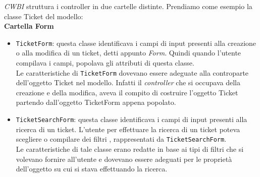 \noindent
\textit{CWBI} struttura i controller in due cartelle distinte. Prendiamo come esempio la classe Ticket del modello:\\

\textbf{Cartella Form}
\begin{itemize}
\item \texttt{TicketForm}: questa classe identificava i campi di input presenti alla creazione o alla modifica di un ticket, detti appunto \textit{Form}. Quindi quando l'utente compilava i campi, popolava gli attributi di questa classe. \\ Le caratteristiche di \texttt{TicketForm} dovevano essere adeguate alla controparte dell'oggetto Ticket nel modello. Infatti il \textit{controller} che si occupava della creazione e della modifica, aveva il compito di costruire l'oggetto Ticket partendo dall'oggetto TicketForm appena popolato. 

\item \texttt{TicketSearchForm}: questa classe identificava i campi di input presenti alla ricerca di un ticket. L'utente per effettuare la ricerca di un ticket poteva scegliere o compilare dei filtri , rappresentati da \texttt{TicketSearchForm}. \\
Le caratteristiche di tale classe erano redatte in base ai tipi di filtri che si volevano fornire all'utente e dovevano essere adeguati per le proprietà dell'oggetto su cui si stava effettuando la ricerca.

\end{itemize}
\medskip


